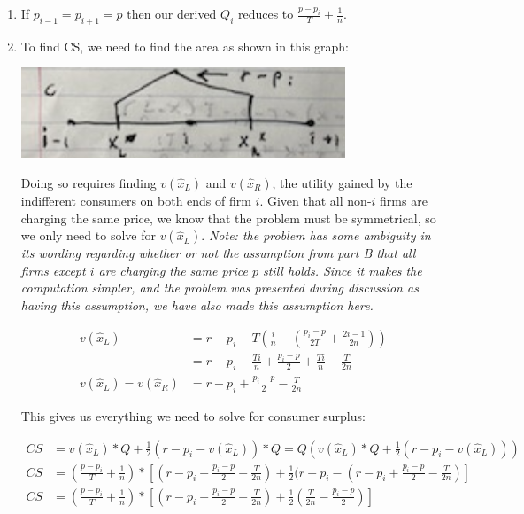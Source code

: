 \documentclass[12pt,letterpaper]{article}
\begin{document}
\begin{enumerate}
\begin{enumerate}
\item If $p_{i-1} = p_{i+1} = p$ then our derived $Q_i$ reduces to  $\frac{p-p_i}{T} + \frac{1}{n}$.

\item To find CS, we need to find the area as shown in this graph:

\includegraphics{2c.PNG}

Doing so requires finding $v(\hat{x}_L)$ and $v(\hat{x}_R)$, the utility gained by the indifferent consumers on both ends of firm $i$. Given that all non-$i$ firms are charging the same price, we know that the problem must be symmetrical, so we only need to solve for $v(\hat{x}_L)$. \textit{Note: the problem has some ambiguity in its wording regarding whether or not the assumption from part B that all firms except $i$ are charging the same price $p$ still holds. Since it makes the computation simpler, and the problem was presented during discussion as having this assumption, we have also made this assumption here.}

\begin{align*}
	v(\hat{x}_L) &= r - p_i - T(\frac{i}{n} - (\frac{p_i - p}{2T} + \frac{2i - 1}{2n})) \\
	&= r - p_i - \frac{Ti}{n} + \frac{p_i - p}{2} + \frac{Ti}{n} - \frac{T}{2n} \\
	v(\hat{x}_L) = v(\hat{x}_R) &= r - p_i + \frac{p_i - p}{2} - \frac{T}{2n}
\end{align*}

This gives us everything we need to solve for consumer surplus:

\begin{align*}
	CS &= v(\hat{x}_L) * Q + \frac{1}{2} (r-p_i - v(\hat{x}_L)) * Q = Q (v(\hat{x}_L) * Q + \frac{1}{2} (r-p_i - v(\hat{x}_L))) \\
	CS &= (\frac{p-p_i}{T} + \frac{1}{n}) * [(r - p_i + \frac{p_i - p}{2} - \frac{T}{2n}) + \frac{1}{2} (r - p_i - (r - p_i + \frac{p_i - p}{2} - \frac{T}{2n})] \\
	CS &= (\frac{p-p_i}{T} + \frac{1}{n}) * [(r - p_i + \frac{p_i - p}{2} - \frac{T}{2n}) + \frac{1}{2} (\frac{T}{2n} - \frac{p_i - p}{2})]
\end{align*}


\end{enumerate}
\end{enumerate}
\end{document}
